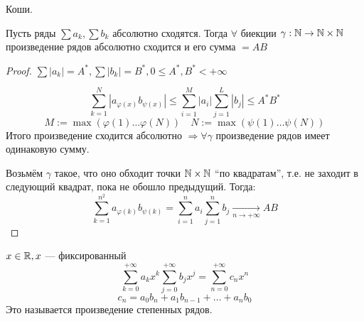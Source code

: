 \begin{theorem}
    Коши.

    Пусть ряды $\sum a_k, \sum b_k$ абсолютно сходятся. Тогда $\forall$ биекции $\gamma:\mathbb{N}\to\mathbb{N}\times\mathbb{N}$ произведение рядов абсолютно сходится и его сумма $=AB$ 
\end{theorem}
\begin{proof}
    $\sum |a_k|=A^*, \sum |b_k|=B^*, 0\le A^*,B^*<+\infty$

    $$\sum_{k=1}^N |a_{\varphi(x)}b_{\psi(x)}|\le \sum_{i=1}^{M}|a_i|\sum_{j=1}^L |b_j|\le A^*B^*$$
    $$M:=\max(\varphi(1)\ldots \varphi(N)) \quad N:=\max(\psi(1)\ldots \psi(N))$$
    Итого произведение сходится абсолютно $\Rightarrow \forall \gamma$ произведение рядов имеет одинаковую сумму.

    Возьмём $\gamma$ такое, что оно обходит точки $\mathbb{N}\times\mathbb{N}$ ``по квадратам'', т.е. не заходит в следующий квадрат, пока не обошло предыдущий. Тогда:
    $$\sum_{k=1}^{n^2}a_{\varphi(k)}b_{\psi(k)}=\sum_{i=1}^n a_i \sum_{j=1}^n b_j\xrightarrow[n\to+\infty]{}AB$$
\end{proof}

\begin{example}
    $x\in\mathbb{R}, x$ --- фиксированный
    $$\sum_{k=0}^{+\infty} a_kx^k \sum_{j=0}^{+\infty} b_jx^j = \sum_{n=0}^{+\infty} c_n x^n$$
    $$c_n=a_0b_n+a_1b_{n-1}+\ldots+a_nb_0$$
    Это называется произведение степенных рядов.
\end{example}


